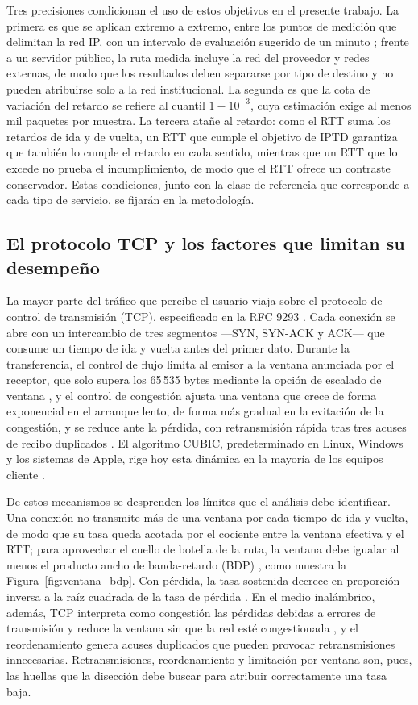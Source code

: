 Tres precisiones condicionan el uso de estos objetivos en el presente trabajo. La primera es que se aplican extremo a extremo, entre los puntos de medición que delimitan la red IP, con un intervalo de evaluación sugerido de un minuto \cite{ituy1541}; frente a un servidor público, la ruta medida incluye la red del proveedor y redes externas, de modo que los resultados deben separarse por tipo de destino y no pueden atribuirse solo a la red institucional. La segunda es que la cota de variación del retardo se refiere al cuantil $1-10^{-3}$, cuya estimación exige al menos mil paquetes por muestra. La tercera atañe al retardo: como el RTT suma los retardos de ida y de vuelta, un RTT que cumple el objetivo de IPTD garantiza que también lo cumple el retardo en cada sentido, mientras que un RTT que lo excede no prueba el incumplimiento, de modo que el RTT ofrece un contraste conservador. Estas condiciones, junto con la clase de referencia que corresponde a cada tipo de servicio, se fijarán en la metodología.

\subsection{El protocolo TCP y los factores que limitan su desempeño}

La mayor parte del tráfico que percibe el usuario viaja sobre el protocolo de control de transmisión (TCP), especificado en la RFC 9293 \cite{rfc9293}. Cada conexión se abre con un intercambio de tres segmentos ---SYN, SYN-ACK y ACK--- que consume un tiempo de ida y vuelta antes del primer dato. Durante la transferencia, el control de flujo limita al emisor a la ventana anunciada por el receptor, que solo supera los 65\,535 bytes mediante la opción de escalado de ventana \cite{rfc7323}, y el control de congestión ajusta una ventana que crece de forma exponencial en el arranque lento, de forma más gradual en la evitación de la congestión, y se reduce ante la pérdida, con retransmisión rápida tras tres acuses de recibo duplicados \cite{rfc5681}. El algoritmo CUBIC, predeterminado en Linux, Windows y los sistemas de Apple, rige hoy esta dinámica en la mayoría de los equipos cliente \cite{rfc9438}.

De estos mecanismos se desprenden los límites que el análisis debe identificar. Una conexión no transmite más de una ventana por cada tiempo de ida y vuelta, de modo que su tasa queda acotada por el cociente entre la ventana efectiva y el RTT; para aprovechar el cuello de botella de la ruta, la ventana debe igualar al menos el producto ancho de banda-retardo (BDP) \cite{rfc6349}, como muestra la Figura~\ref{fig:ventana_bdp}. Con pérdida, la tasa sostenida decrece en proporción inversa a la raíz cuadrada de la tasa de pérdida \cite{mathis1997macroscopic}. En el medio inalámbrico, además, TCP interpreta como congestión las pérdidas debidas a errores de transmisión y reduce la ventana sin que la red esté congestionada \cite{balakrishnan1997comparison}, y el reordenamiento genera acuses duplicados que pueden provocar retransmisiones innecesarias. Retransmisiones, reordenamiento y limitación por ventana son, pues, las huellas que la disección debe buscar para atribuir correctamente una tasa baja.

